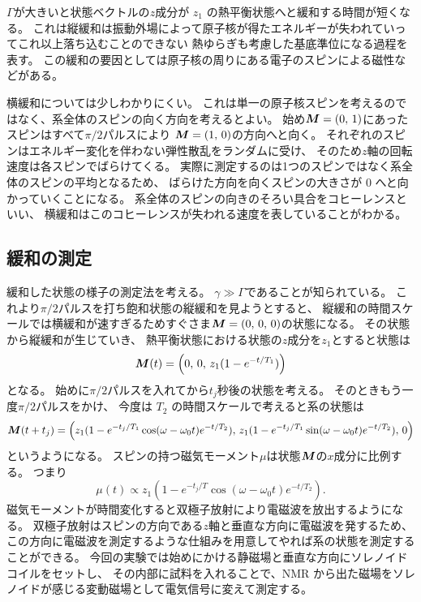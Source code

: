\documentclass[11pt,dvipdfmx,a4paper]{jsarticle}
\begin{document}
\(\Gamma\)が大きいと状態ベクトルの\(z\)成分が \(z_1\) の熱平衡状態へと緩和する時間が短くなる。
これは縦緩和は振動外場によって原子核が得たエネルギーが失われていってこれ以上落ち込むことのできない
熱ゆらぎも考慮した基底準位になる過程を表す。
この緩和の要因としては原子核の周りにある電子のスピンによる磁性などがある。%

横緩和については少しわかりにくい。
これは単一の原子核スピンを考えるのではなく、系全体のスピンの向く方向を考えるとよい。
始め\(\vb*{M}=(0,\,1)\)にあったスピンはすべて\(\pi/2\)パルスにより
\(\vb*{M}=(1,\,0)\)の方向へと向く。
それぞれのスピンはエネルギー変化を伴わない弾性散乱をランダムに受け、
そのため\(z\)軸の回転速度は各スピンでばらけてくる。
実際に測定するのは1つのスピンではなく系全体のスピンの平均となるため、
ばらけた方向を向くスピンの大きさが 0 へと向かっていくことになる。
系全体のスピンの向きのそろい具合をコヒーレンスといい、
横緩和はこのコヒーレンスが失われる速度を表していることがわかる。

\subsection{緩和の測定}
緩和した状態の様子の測定法を考える。
\(\gamma\gg\Gamma\)であることが知られている。
これより\(\pi/2\)パルスを打ち飽和状態の縦緩和を見ようとすると、
縦緩和の時間スケールでは横緩和が速すぎるためすぐさま\(\vb*{M}=(0,\,0,\,0)\)の状態になる。
その状態から縦緩和が生じていき、
熱平衡状態における状態の\(z\)成分を\(z_1\)とすると状態は
\begin{equation}
	\vb*{M}(t) = \qty(0,\,0,\,z_1(1-e^{-t/T_1}))
\end{equation}
となる。
始めに\(\pi/2\)パルスを入れてから\(t_j\)秒後の状態を考える。
そのときもう一度\(\pi/2\)パルスをかけ、
今度は \(T_2\) の時間スケールで考えると系の状態は
\begin{equation}
	\vb*{M}(t+t_j) = \qty(z_1(1-e^{-t_j/T_1}\cos(\omega-\omega_0 t)e^{-t/T_2}),\,
	z_1(1-e^{-t_j/T_1}\sin(\omega-\omega_0 t)e^{-t/T_2}),\,0)
\end{equation}
というようになる。
スピンの持つ磁気モーメント\(\mu\)は状態\(\vb*{M}\)の\(x\)成分に比例する。
つまり
\begin{equation}
	\mu(t) \propto z_1(1-e^{-t_j/T}\cos(\omega-\omega_0 t)e^{-t/T_2}). \label{eq:MD_T2_ev}
\end{equation}
磁気モーメントが時間変化すると双極子放射により電磁波を放出するようになる。
双極子放射はスピンの方向である\(z\)軸と垂直な方向に電磁波を発するため、
この方向に電磁波を測定するような仕組みを用意してやれば系の状態を測定することができる。
今回の実験では始めにかける静磁場と垂直な方向にソレノイドコイルをセットし、
その内部に試料を入れることで、NMR から出た磁場をソレノイドが感じる変動磁場として電気信号に変えて測定する。
\end{document}
